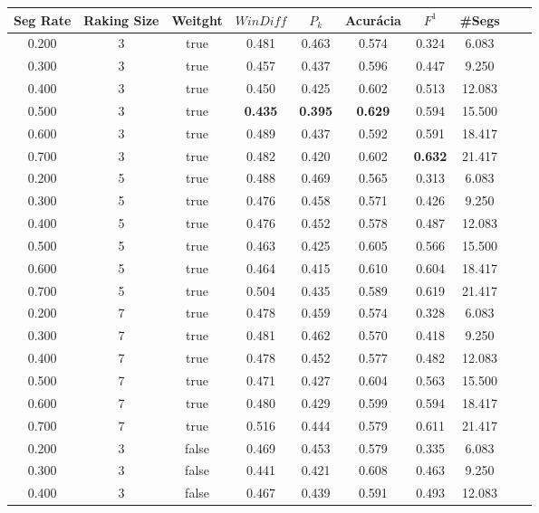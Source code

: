 \documentclass{article}
\begin{document}
\begin{longtable}[c]{|c|c|c|c|c|c|c|c|c|c|} 
\hline 
 Seg Rate & Raking Size & Weitght & $WinDiff$ & $P_k$ & Acurácia & $F^1$ & \#Segs\\ \hline 
 0.200 & 3 & true & 0.481 & 0.463 & 0.574 & 0.324 & 6.083  \\ \hline 
 0.300 & 3 & true & 0.457 & 0.437 & 0.596 & 0.447 & 9.250  \\ \hline 
 0.400 & 3 & true & 0.450 & 0.425 & 0.602 & 0.513 & 12.083  \\ \hline 
 0.500 & 3 & true & \cellcolor{gray!20} \textbf{0.435} & \cellcolor{gray!20} \textbf{0.395} & \cellcolor{gray!20} \textbf{0.629} & 0.594 & 15.500  \\ \hline 
 0.600 & 3 & true & 0.489 & 0.437 & 0.592 & 0.591 & 18.417  \\ \hline 
 0.700 & 3 & true & 0.482 & 0.420 & 0.602 & \cellcolor{gray!20} \textbf{0.632} & 21.417  \\ \hline 
 0.200 & 5 & true & 0.488 & 0.469 & 0.565 & 0.313 & 6.083  \\ \hline 
 0.300 & 5 & true & 0.476 & 0.458 & 0.571 & 0.426 & 9.250  \\ \hline 
 0.400 & 5 & true & 0.476 & 0.452 & 0.578 & 0.487 & 12.083  \\ \hline 
 0.500 & 5 & true & 0.463 & 0.425 & 0.605 & 0.566 & 15.500  \\ \hline 
 0.600 & 5 & true & 0.464 & 0.415 & 0.610 & 0.604 & 18.417  \\ \hline 
 0.700 & 5 & true & 0.504 & 0.435 & 0.589 & 0.619 & 21.417  \\ \hline 
 0.200 & 7 & true & 0.478 & 0.459 & 0.574 & 0.328 & 6.083  \\ \hline 
 0.300 & 7 & true & 0.481 & 0.462 & 0.570 & 0.418 & 9.250  \\ \hline 
 0.400 & 7 & true & 0.478 & 0.452 & 0.577 & 0.482 & 12.083  \\ \hline 
 0.500 & 7 & true & 0.471 & 0.427 & 0.604 & 0.563 & 15.500  \\ \hline 
 0.600 & 7 & true & 0.480 & 0.429 & 0.599 & 0.594 & 18.417  \\ \hline 
 0.700 & 7 & true & 0.516 & 0.444 & 0.579 & 0.611 & 21.417  \\ \hline 
 0.200 & 3 & false & 0.469 & 0.453 & 0.579 & 0.335 & 6.083  \\ \hline 
 0.300 & 3 & false & 0.441 & 0.421 & 0.608 & 0.463 & 9.250  \\ \hline 
 0.400 & 3 & false & 0.467 & 0.439 & 0.591 & 0.493 & 12.083  \\ \hline 

\end{longtable}
\end{document}
